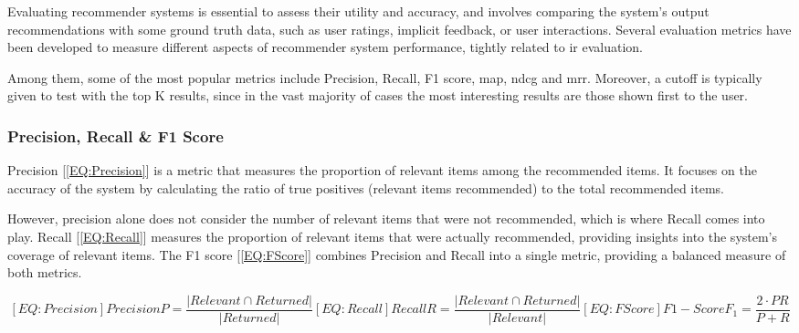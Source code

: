 Evaluating recommender systems is essential to assess their utility and accuracy, and involves comparing the system's output recommendations with some ground truth data, such as user ratings, implicit feedback, or user interactions. Several evaluation metrics have been developed to measure different aspects of recommender system performance, tightly related to \ac{ir} evaluation.

Among them, some of the most popular metrics include Precision, Recall, F1 score, \acl{map}, \acl{ndcg} and \acl{mrr}. Moreover, a cutoff is typically given to test with the top K results, since in the vast majority of cases the most interesting results are those shown first to the user.

\subsubsection{Precision, Recall \& F1 Score}

Precision [\ref{EQ:Precision}] is a metric that measures the proportion of relevant items among the recommended items. It focuses on the accuracy of the system by calculating the ratio of true positives (relevant items recommended) to the total recommended items.

However, precision alone does not consider the number of relevant items that were not recommended, which is where Recall comes into play. Recall [\ref{EQ:Recall}] measures the proportion of relevant items that were actually recommended, providing insights into the system's coverage of relevant items. The F1 score [\ref{EQ:FScore}] combines Precision and Recall into a single metric, providing a balanced measure of both metrics.

\begin{multicols}{2}
    \begin{subequations}
        \begin{equation}[EQ:Precision]{Precision}
            P=\frac{\lvert Relevant \cap Returned \rvert}{\lvert Returned \rvert}
        \end{equation}
        \begin{equation}[EQ:Recall]{Recall}
            R=\frac{\lvert Relevant \cap Returned \rvert}{\lvert Relevant \rvert}
        \end{equation}
        \begin{equation}[EQ:FScore]{F1-Score}
            F_1=\frac{2\cdot PR}{P + R}
        \end{equation}
    \end{subequations}
\end{multicols}

